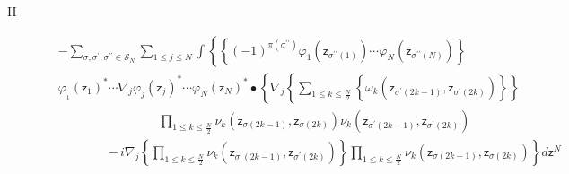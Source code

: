 \documentclass[aps,preprint]{revtex4}%
\begin{document}
\begin{description}
\item[II]
\begin{align}
&  -%
{\textstyle\sum\limits_{\sigma,\sigma^{\prime},\sigma^{\prime\prime}%
\in\mathcal{S}_{N}}}
{\displaystyle\sum\limits_{1\leq j\leq N}}
\int\left\{  \left\{  \left(  -1\right)  ^{\pi\left(  \sigma^{\prime\prime
}\right)  }\varphi_{1}\left(  \mathsf{z}_{\sigma^{\prime\prime}\left(
1\right)  }\right)  \cdots\varphi_{N}\left(  \mathsf{z}_{\sigma^{\prime\prime
}\left(  N\right)  }\right)  \right\}  \right. \nonumber\\
&  \varphi_{_{1}}\left(  \mathsf{z}_{1}\right)  ^{\ast}\cdots\nabla_{j}%
\varphi_{j}\left(  \mathsf{z}_{j}\right)  ^{\ast}\cdots\varphi_{N}\left(
\mathsf{z}_{N}\right)  ^{\ast}\bullet\left\{  \nabla_{j}\left\{
{\displaystyle\sum\limits_{1\leq k\leq\frac{N}{2}}}
\left\{  \omega_{k}\left(  \mathsf{z}_{\sigma^{\prime}\left(  2k-1\right)
},\mathsf{z}_{\sigma^{\prime}\left(  2k\right)  }\right)  \right\}  \right\}
\right. \nonumber\\
&  \qquad\qquad\left.  \qquad\right.  \qquad%
{\displaystyle\prod\limits_{1\leq k\leq\frac{N}{2}}}
\nu_{k}\left(  \mathsf{z}_{\sigma\left(  2k-1\right)  },\mathsf{z}%
_{\sigma\left(  2k\right)  }\right)  \nu_{k}\left(  \mathsf{z}_{\sigma
^{\prime}\left(  2k-1\right)  },\mathsf{z}_{\sigma^{\prime}\left(  2k\right)
}\right) \nonumber\\
&  \qquad\qquad\left.  -\,i\nabla_{j}\left\{
{\displaystyle\prod\limits_{1\leq k\leq\frac{N}{2}}}
\nu_{k}\left(  \mathsf{z}_{\sigma^{\prime}\left(  2k-1\right)  }%
,\mathsf{z}_{\sigma^{\prime}\left(  2k\right)  }\right)  \right\}
{\displaystyle\prod\limits_{1\leq k\leq\frac{N}{2}}}
\nu_{k}\left(  \mathsf{z}_{\sigma\left(  2k-1\right)  },\mathsf{z}%
_{\sigma\left(  2k\right)  }\right)  \right\}  d\mathsf{z}^{N}%
\end{align}



\end{description}
\end{document}
